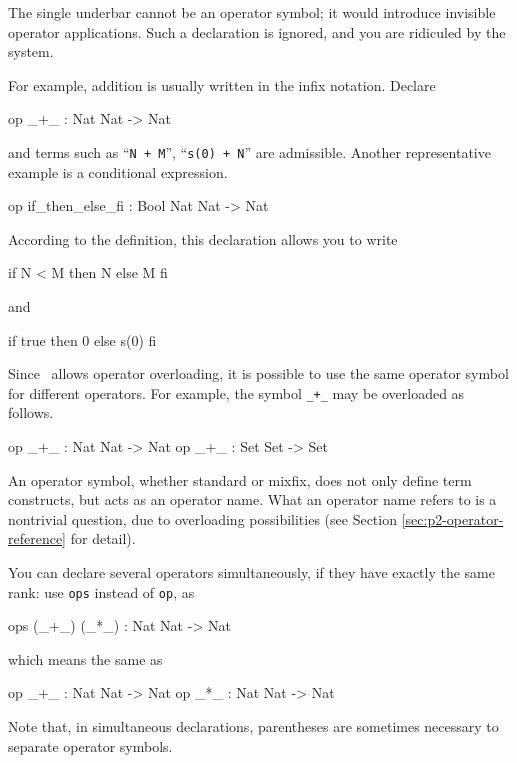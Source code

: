 \documentclass[a4paper]{memoir}
\begin{document}
\begin{warning}
  The single underbar cannot be an operator symbol; it would introduce
  invisible operator applications. Such a declaration is
  ignored, and you are ridiculed by the system.
\end{warning}

For example, addition is usually written in the infix notation. Declare
\begin{vvtm}
\begin{ccode}
  op _+_ : Nat Nat -> Nat
\end{ccode}
\end{vvtm}
and terms such as ``\texttt{N + M}'', ``\texttt{s(0) + N}'' are admissible.
Another representative example is a conditional expression.
\begin{vvtm}
\begin{ccode}
  op if_then_else_fi : Bool Nat Nat -> Nat
\end{ccode}
\end{vvtm}
According to the definition, this declaration allows you to write
\begin{vvtm}
\begin{ccode}
  if N < M then N else M fi
\end{ccode}
\end{vvtm}
and
\begin{vvtm}
\begin{ccode}
  if true then 0 else s(0) fi
\end{ccode}
\end{vvtm}
Since \cafeobj~allows operator overloading, it is
possible to use the same operator symbol for different operators.
For example, the symbol \verb|_+_| may be overloaded as follows.
\begin{vvtm}
\begin{ccode}
  op _+_ : Nat Nat -> Nat
  op _+_ : Set Set -> Set
\end{ccode}
\end{vvtm}
An operator symbol, whether standard or mixfix, does not only define
term constructs, but acts as an operator name. What an operator name
refers to is a nontrivial question, due to overloading possibilities
(see Section \ref{sec:p2-operator-reference} for detail).

You can declare several operators simultaneously, if they have exactly
the same rank:
use \verb|ops| instead of \verb|op|, as
\begin{vvtm}
\begin{ccode}
  ops (_+_) (_*_) : Nat Nat -> Nat
\end{ccode}
\end{vvtm}
which means the same as
\begin{vvtm}
\begin{ccode}
  op _+_ : Nat Nat -> Nat
  op _*_ : Nat Nat -> Nat
\end{ccode}
\end{vvtm}
Note that, in simultaneous declarations, parentheses are sometimes necessary
to separate operator symbols.
\end{document}
